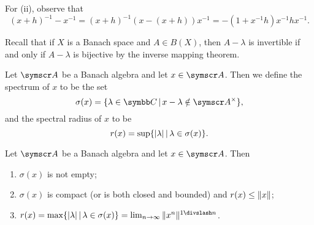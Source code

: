\begin{sketch}
  For (ii), observe that
  \begin{equation}
    (x+h)^{-1}-x^{-1}=(x+h)^{-1}(x-(x+h))x^{-1}=-(1+x^{-1}h)x^{-1}hx^{-1}.
  \end{equation}
\end{sketch}

Recall that if $X$ is a Banach space and $A\in B(X)$, then $A-\lambda$ is invertible if and only if $A-\lambda$ is bijective by the inverse mapping theorem.

\begin{definition}
  Let $\BA A$ be a Banach algebra and let $x\in \BA A$. Then we define the spectrum of $x$ to be the set
  \begin{equation*}
    \sigma(x)=\{\lambda\in \CC\VERT x-\lambda\notin \BA{A}^{\times}\},
  \end{equation*}
  and the spectral radius of $x$ to be
  \begin{equation*}
    r(x)=\sup\{\vert\lambda\vert\,\vert\, \lambda\in \sigma(x)\}.
  \end{equation*}
\end{definition}

\begin{proposition}
  Let $\BA A$ be a Banach algebra and let $x\in \BA A$. Then
  \begin{enumerate}[label=(\arabic*)]
    \item $\sigma(x)$ is not empty;
    \item $\sigma(x)$ is compact (or is both closed and bounded) and $r(x)\leq \Vert x\Vert$;
    \item $r(x)=\max\{\ABS{\lambda}\VERT \lambda\in \sigma(x)\}=\lim_{n\to\infty}\NORM{x^n}^{1\DIV n}$.
  \end{enumerate}
\end{proposition}

